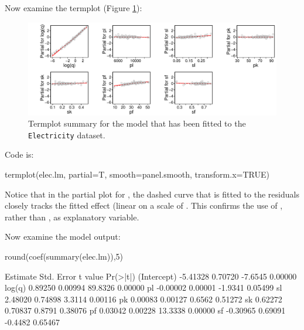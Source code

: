 Now examine the termplot (Figure \ref{fig:elec-log-tplot}):
\begin{figure}[h]
\begin{Schunk}


\centerline{\includegraphics[width=\textwidth]{figs/8-elec-me-tplot-1} }

\end{Schunk}
\caption{Termplot summary for the model that has been fitted to the
  \texttt{Electricity} dataset.\label{fig:elec-log-tplot}}
\end{figure}
\noindent Code is:
\begin{Schunk}
\begin{Sinput}
termplot(elec.lm, partial=T, smooth=panel.smooth,
         transform.x=TRUE)
\end{Sinput}
\end{Schunk}
Notice that in the partial plot for , the dashed curve that is
fitted to the residuals closely tracks the fitted effect (linear on a
scale of .  This confirms the use of ,
rather than , as explanatory variable.

Now examine the model output:
\begin{Schunk}
\begin{Sinput}
round(coef(summary(elec.lm)),5)
\end{Sinput}
\begin{Soutput}
            Estimate Std. Error t value Pr(>|t|)
(Intercept) -5.41328    0.70720 -7.6545  0.00000
log(q)       0.89250    0.00994 89.8326  0.00000
pl          -0.00002    0.00001 -1.9341  0.05499
sl           2.48020    0.74898  3.3114  0.00116
pk           0.00083    0.00127  0.6562  0.51272
sk           0.62272    0.70837  0.8791  0.38076
pf           0.03042    0.00228 13.3338  0.00000
sf          -0.30965    0.69091 -0.4482  0.65467
\end{Soutput}
\end{Schunk}

